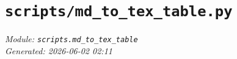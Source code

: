 
\section{\texttt{scripts/md\_to\_tex\_table.py}}
\textit{Module: \texttt{scripts.md\_to\_tex\_table}} \\
\textit{Generated: 2026-06-02 02:11} \\

